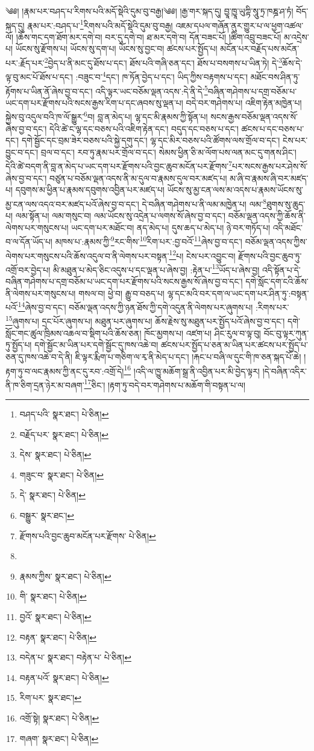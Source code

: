 \setcounter{footnote}{0} 
༄༅། །རྣམ་པར་བཤད་པ་རིགས་པའི་མདོ་སྡེའི་དུམ་བུ་བརྒྱ།༄༅། །རྒྱ་གར་སྐད་དུ། བྱཱ་ཁྱཱ་ཡུཀྟི་སཱུ་ཏྲ་ཁཎྜ་ཤ་ཏཾ། བོད་སྐད་དུ། རྣམ་པར་:བཤད་པ་\footnote{བཤད་པའི་  སྣར་ཐང་།  པེ་ཅིན། }རིགས་པའི་མདོ་སྡེའི་དུམ་བུ་བརྒྱ། འཇམ་དཔལ་གཞོན་ནུར་གྱུར་པ་ལ་ཕྱག་འཚལ་ལོ། །ཆོས་གང་དག་ཐོག་མར་དགེ་བ། བར་དུ་དགེ་བ། ཐ་མར་དགེ་བ། དོན་བཟང་པོ། །ཚིག་འབྲུ་བཟང་པོ། མ་འདྲེས་པ། ཡོངས་སུ་རྫོགས་པ། ཡོངས་སུ་དག་པ། ཡོངས་སུ་བྱང་བ། ཚངས་པར་སྤྱོད་པ། མངོན་པར་བརྗོད་པས་མངོན་པར་:རྗོད་པར་\footnote{བརྗོད་པར་  སྣར་ཐང་།  པེ་ཅིན། }བྱེད་པ་ནི་མང་དུ་ཐོས་པ་དང་། ཐོས་པའི་གཞི་ཅན་དང་། ཐོས་པ་བསགས་པ་ཡིན་ཏེ། དེ་\footnote{དེས་  སྣར་ཐང་།  པེ་ཅིན། }ཆོས་དེ་ལྟ་བུ་མང་པོ་ཐོས་པ་དང་། :བཟུང་བ་\footnote{གཟུང་བ་  སྣར་ཐང་།  པེ་ཅིན། }དང་། ཁ་ཏོན་བྱེད་པ་དང་། ཡིད་ཀྱིས་བརྟགས་པ་དང་། མཐོང་བས་ཤིན་ཏུ་རྟོགས་པ་ཡིན་ནོ་ཞེས་བྱ་བ་དང་། འདི་ལྟར་ཡང་བཅོམ་ལྡན་འདས་:དེ་ནི་དེ་\footnote{དེ་  སྣར་ཐང་།  པེ་ཅིན། }བཞིན་གཤེགས་པ་དགྲ་བཅོམ་པ་ཡང་དག་པར་རྫོགས་པའི་སངས་རྒྱས་རིག་པ་དང་ཞབས་སུ་ལྡན་པ། བདེ་བར་གཤེགས་པ། འཇིག་རྟེན་མཁྱེན་པ། སྐྱེས་བུ་འདུལ་བའི་ཁ་ལོ་སྒྱུར་\footnote{བསྒྱུར་  སྣར་ཐང་། }བ། བླ་ན་མེད་པ། ལྷ་དང་མི་རྣམས་ཀྱི་སྟོན་པ། སངས་རྒྱས་བཅོམ་ལྡན་འདས་སོ་ཞེས་བྱ་བ་དང་། དེའི་ཚེ་ང་ལྷ་དང་བཅས་པའི་འཇིག་རྟེན་དང་། བདུད་དང་བཅས་པ་དང་། ཚངས་པ་དང་བཅས་པ་དང་། དགེ་སྦྱོང་དང་བྲམ་ཟེར་བཅས་པའི་སྐྱེ་དགུ་དང་། ལྷ་དང་མིར་བཅས་པའི་ཚོགས་ལས་གྲོལ་བ་དང་། ངེས་པར་བྱུང་བ་དང་། བྲལ་བ་དང་། རབ་ཏུ་རྣམ་པར་གྲོལ་བ་དང་། སེམས་ཕྱིན་ཅི་མ་ལོག་པས་ལན་མང་དུ་གནས་ཤིང་། དེའི་ཚེ་བདག་ནི་བླ་ན་མེད་པ་ཡང་དག་པར་རྫོགས་པའི་བྱང་ཆུབ་མངོན་པར་རྫོགས་\footnote{རྫོགས་པའི་བྱང་ཆུབ་མངོན་པར་རྫོགས་  པེ་ཅིན། }པར་སངས་རྒྱས་པར་ཤེས་སོ་ཞེས་བྱ་བ་དང་། བཙུན་པ་བཅོམ་ལྡན་འདས་ནི་མ་དུལ་བ་རྣམས་དུལ་བར་མཛད་པ། མ་ཞི་བ་རྣམས་ཞི་བར་མཛད་པ། དབུགས་མ་ཕྱིན་པ་རྣམས་དབུགས་འབྱིན་པར་མཛད་པ། ཡོངས་སུ་མྱ་ངན་ལས་མ་འདས་པ་རྣམས་ཡོངས་སུ་མྱ་ངན་ལས་འདའ་བར་མཛད་པའོ་ཞེས་བྱ་བ་དང་། དེ་བཞིན་གཤེགས་པ་ནི་ལམ་མཁྱེན་པ། ལམ་\footnote{}ཐུགས་སུ་ཆུད་པ། ལམ་སྟོན་པ། ལམ་གསུང་བ། ལམ་ཡོངས་སུ་འདྲེན་པ་ལགས་སོ་ཞེས་བྱ་བ་དང་། བཅོམ་ལྡན་འདས་ཀྱི་ཆོས་ནི་ལེགས་པར་གསུངས་པ། ཡང་དག་པར་མཐོང་བ། ནད་མེད་པ། དུས་ཆད་པ་མེད་པ། ཉེ་བར་གཏོད་པ། འདི་མཐོང་བ་ལ་དོན་ཡོད་པ། མཁས་པ་:རྣམས་ཀྱི་\footnote{རྣམས་ཀྱིས་  སྣར་ཐང་།  པེ་ཅིན། }རང་གིས་\footnote{གི་  སྣར་ཐང་།  པེ་ཅིན། }རིག་པར་:བྱ་བའོ་\footnote{བྱའོ་  སྣར་ཐང་།  པེ་ཅིན། }ཞེས་བྱ་བ་དང་། བཅོམ་ལྡན་འདས་ཀྱིས་ལེགས་པར་གསུངས་པའི་ཆོས་འདུལ་བ་ནི་ལེགས་པར་བསྟན་\footnote{བརྟན་  སྣར་ཐང་།  པེ་ཅིན། }པ། ངེས་པར་འབྱུང་བ། རྫོགས་པའི་བྱང་ཆུབ་ཏུ་འགྲོ་བར་བྱེད་པ། མི་མཐུན་པ་མེད་ཅིང་འདུས་པ་དང་ལྡན་པ་ཞེས་བྱ། :རྟེན་པ་\footnote{བདེན་པ་  སྣར་ཐང་། བརྟེན་པ་  པེ་ཅིན། }ཡོད་པ་ཞེས་བྱ། འདི་སྟོན་པ་དེ་བཞིན་གཤེགས་པ་དགྲ་བཅོམ་པ་ཡང་དག་པར་རྫོགས་པའི་སངས་རྒྱས་སོ་ཞེས་བྱ་བ་དང་། དགེ་སློང་དག་ངའི་ཆོས་ནི་ལེགས་པར་གསུངས་པ། གསལ་བ། ཕྱེ་བ། རྒྱུ་བ་བཅད་པ། ལྷ་དང་མའི་བར་དག་ལ་ཡང་དག་པར་ཤིན་ཏུ་:བསྟན་པའོ་\footnote{བརྟན་པའོ་  སྣར་ཐང་།  པེ་ཅིན། }ཞེས་བྱ་བ་དང་། བཅོམ་ལྡན་འདས་ཀྱི་ཉན་ཐོས་ཀྱི་དགེ་འདུན་ནི་ལེགས་པར་ཞུགས་པ། :རིགས་པར་\footnote{རིག་པར་  སྣར་ཐང་། }ཞུགས་པ། དྲང་པོར་ཞུགས་པ། མཐུན་པར་ཞུགས་པ། ཆོས་རྗེས་སུ་མཐུན་པར་སྤྱོད་པའོ་ཞེས་བྱ་བ་དང་། དགེ་སློང་གང་ཚུལ་ཁྲིམས་འཆལ་བ་སྡིག་པའི་ཆོས་ཅན། ཁོང་མྱགས་པ། འཛག་པ། ཤིང་རུལ་བ་ལྟ་བུ། བོང་བུ་ལྟར་ཀུན་ཏུ་སྤྱོད་པ། དགེ་སྦྱོང་མ་ཡིན་པར་དགེ་སྦྱོང་དུ་ཁས་འཆེ་བ། ཚངས་པར་སྤྱོད་པ་ཅན་མ་ཡིན་པར་ཚངས་པར་སྤྱོད་པ་ཅན་དུ་ཁས་འཆེ་བ་དེ་ནི། ཇི་ལྟར་རྨིག་པ་གཅིག་ལ་རྭ་ནི་མེད་པ་དང་། །རྐང་པ་བཞི་ལ་དུང་གི་ཁ་ཅན་སྐད་པོ་ཆེ། །རྟག་ཏུ་བ་ལང་རྣམས་ཀྱི་ནང་དུ་རབ་:འགྲོ་དེ།\footnote{འགྲོ་སྟེ།  སྣར་ཐང་།  པེ་ཅིན། } །འདི་ལ་ཁྱུ་མཆོག་སྒྲ་ནི་འབྱིན་པར་མི་བྱེད་ལྟར། །དེ་བཞིན་འདིར་ནི་ཁ་ཅིག་དྲན་ཉེར་མ་བཞག་\footnote{གཞག་  སྣར་ཐང་།  པེ་ཅིན། }ཅིང་། །རྟག་ཏུ་བདེ་བར་གཤེགས་པ་མཆོག་གི་བསྟན་པ་ལ། 